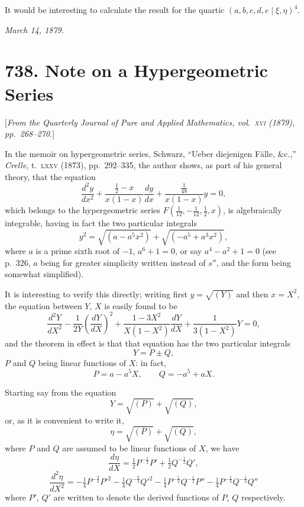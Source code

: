 \documentclass[11pt,a4paper]{book}
\begin{document}
It would be interesting to calculate the result for the quartic
$(a,b,c,d,e\mid\xi,\eta)^4$.

\textit{March 14, 1879.}

\newpage
\section*{738. Note on a Hypergeometric Series}

[\textit{From the Quarterly Journal of Pure and Applied Mathematics, vol.~\textsc{xvi} (1879),
pp.~268--270.}]

In the memoir on hypergeometric series, Schwarz, ``Ueber diejenigen
F\"alle, \&c.,'' \textit{Crelle}, t.~\textsc{lxxv} (1873), pp.~292--335, the author shows, as part
of his general theory, that the equation
\[
\frac{d^2y}{dx^2}
+ \frac{\frac{1}{2} - x}{x(1-x)}\frac{dy}{dx}
+ \frac{\frac{1}{48}}{x(1-x)}y = 0,
\]
which belongs to the hypergeometric series
$F(\tfrac{1}{12},-\tfrac{1}{12},\tfrac{1}{2},x)$, is algebraically integrable,
having in fact the two particular integrals
\[
y^2 = \sqrt{(a-a^5x^2)} + \sqrt{(-a^5+a^3x^2)},
\]
where $a$ is a prime sixth root of $-1$, $a^6+1=0$, or say $a^4-a^2+1=0$
(see p.~326, $a$ being for greater simplicity written instead of $s''$, and the
form being somewhat simplified).

It is interesting to verify this directly; writing first $y=\sqrt{(Y)}$
and then $x=X^2$, the equation between $Y$, $X$ is easily found to be
\[
\frac{d^2Y}{dX^2}
- \frac{1}{2Y}\left(\frac{dY}{dX}\right)^2
+ \frac{1-3X^2}{X(1-X^2)}\frac{dY}{dX}
+ \frac{1}{3(1-X^2)}Y = 0,
\]
and the theorem in effect is that that equation has the two particular integrals
\[
Y = P \pm Q,
\]
$P$ and $Q$ being linear functions of $X$: in fact,
\[
P = a - a^5X,\qquad Q = -a^5 + aX.
\]

Starting say from the equation
\[
Y = \sqrt{(P)} + \sqrt{(Q)},
\]
or, as it is convenient to write it,
\[
\eta = \sqrt{(P)} + \sqrt{(Q)},
\]
where $P$ and $Q$ are assumed to be linear functions of $X$, we have
\[
\frac{d\eta}{dX} = \tfrac{1}{2}P^{-\frac{1}{2}}P' + \tfrac{1}{2}Q^{-\frac{1}{2}}Q',
\]
\[
\frac{d^2\eta}{dX^2}
= -\tfrac{1}{4}P^{-\frac{3}{2}}P'^2 - \tfrac{1}{4}Q^{-\frac{3}{2}}Q'^2
- \tfrac{1}{4}P^{-\frac{1}{2}}Q^{-\frac{1}{2}}P''
- \tfrac{1}{4}P^{-\frac{1}{2}}Q^{-\frac{1}{2}}Q''
\]
where $P'$, $Q'$ are written to denote the derived functions of $P$, $Q$ respectively.
\end{document}
